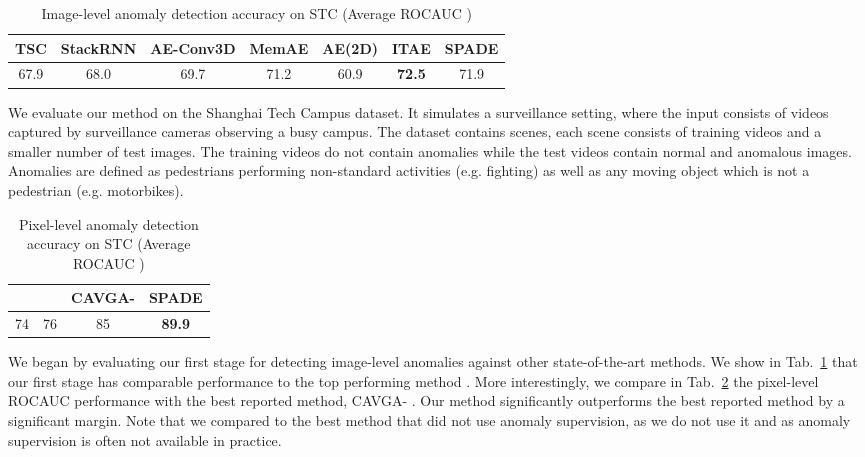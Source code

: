\documentclass[runningheads]{llncs}
\begin{document}
\begin{table}[t]
  \centering
  \caption{Image-level anomaly detection accuracy on STC (Average ROCAUC )}
  \label{tab:mstc_image}

    \begin{tabular}{ccccccc}
    \toprule      

   TSC \cite{luo2017revisit}  & StackRNN \cite{luo2017revisit}  & AE-Conv3D \cite{zhao2017spatio}  & MemAE \cite{gong2019memorizing}  & AE(2D) \cite{hasan2016learning}  & ITAE \cite{huang2019inverse}  & SPADE\\
    \midrule
   67.9 & 68.0 & 69.7 & 71.2 & 60.9 & \textbf{72.5} & 71.9\\
	 \bottomrule
    \end{tabular}
\end{table}

We evaluate our method on the Shanghai Tech Campus dataset. It simulates a surveillance setting, where the input consists of videos captured by surveillance cameras observing a busy campus. The dataset contains  scenes, each scene consists of training videos and a smaller number of test images. The training videos do not contain anomalies while the test videos contain normal and anomalous images. Anomalies are defined as pedestrians performing non-standard activities (e.g. fighting) as well as any moving object which is not a pedestrian (e.g. motorbikes). 

\begin{table}[t]
  \centering
  \caption{Pixel-level anomaly detection accuracy on STC (Average ROCAUC )}
  \label{tab:mstc_table}

    \begin{tabular}{cccc}
    \toprule      

    &  & CAVGA- \cite{venkataramanan2019attention} & SPADE\\
    \midrule
   74 & 76 & 85 & \textbf{89.9} \\
	 \bottomrule
    \end{tabular}
\end{table}

We began by evaluating our first stage for detecting image-level anomalies against other state-of-the-art methods. We show in Tab.~\ref{tab:mstc_image} that our first stage has comparable performance to the top performing method \cite{huang2019inverse}. More interestingly, we compare in Tab.~\ref{tab:mstc_table} the pixel-level ROCAUC performance with the best reported method, CAVGA- \cite{venkataramanan2019attention}. Our method significantly outperforms the best reported method by a significant margin. Note that we compared to the best method that did not use anomaly supervision, as we do not use it and as anomaly supervision is often not available in practice.
\end{document}
